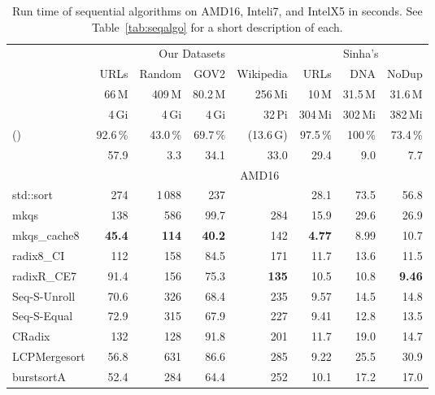 \documentclass[a4paper]{myjournal}
\begin{document}
\begin{table}[p]\centering\small
\caption{Run time of sequential algorithms on AMD16, Inteli7, and IntelX5 in seconds. See Table~\ref{tab:seqalgo} for a short description of each.}\label{tab:seqalgo-results2}
\def\tabcolsep{6pt}
\begin{tabular}{l|rrrr rrr|}
                    & \multicolumn{4}{c|}{Our Datasets} & \multicolumn{3}{c|}{Sinha's} \\
                    & URLs     & Random   & GOV2     & \multicolumn{1}{r|}{Wikipedia} & URLs     & DNA     & NoDup    \\ \hline
                 & 66\,M    & 409\,M   & 80.2\,M  & 256\,Mi   & 10\,M        & 31.5\,M & 31.6\,M  \\
                 & 4\,Gi    & 4\,Gi    & 4\,Gi    & 32\,Pi    & 304\,Mi      & 302\,Mi & 382\,Mi  \\
 ()       & 92.6\,\% & 43.0\,\% & 69.7\,\% & (13.6\,G) & 97.5\,\%     & 100\,\% & 73.4\,\% \\
             & 57.9     & 3.3      & 34.1     & 33.0      & 29.4         & 9.0     & 7.7      \\ \hline
& \multicolumn{7}{c|}{AMD16} \\ \cline{2-8}
std::sort &      274 &  1\,088 &      237 &         &     28.1 &     73.5 &     56.8 \\
            mkqs &      138 &     586 &     99.7 &     284 &     15.9 &     29.6 &     26.9 \\
    mkqs\_cache8 & \bf 45.4 & \bf 114 & \bf 40.2 &     142 & \bf 4.77 &     8.99 &     10.7 \\
      radix8\_CI &      112 &     158 &     84.5 &     171 &     11.7 &     13.6 &     11.5 \\
     radixR\_CE7 &     91.4 &     156 &     75.3 & \bf 135 &     10.5 &     10.8 & \bf 9.46 \\
Seq-S-Unroll &     70.6 &     326 &     68.4 &     235 &     9.57 &     14.5 &     14.8 \\
 Seq-S-Equal &     72.9 &     315 &     67.9 &     227 &     9.41 &     12.8 &     13.5 \\
          CRadix &      132 &     128 &     91.8 &     201 &     11.7 &     19.0 &     14.7 \\
    LCPMergesort &     56.8 &     631 &     86.6 &     285 &     9.22 &     25.5 &     30.9 \\
      burstsortA &     52.4 &     284 &     64.4 &     252 &     10.1 &     17.2 &     17.0 \\

\end{tabular}
\end{table}
\end{document}
